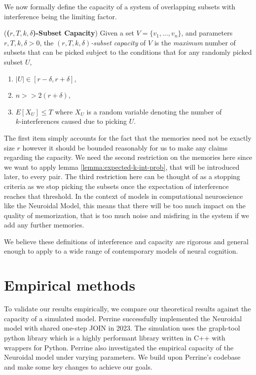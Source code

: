 We now formally define the capacity of a system of overlapping subsets with interference being the limiting factor. 

    \begin{definition} (\textbf{(\textit{$r,T,k,\delta$})-Subset Capacity}) Given a set $V = \{v_1,...,v_n\}$, and parameters $r, T, k, \delta > 0$, the \textit{$(r,T,k,\delta)$-subset capacity} of $V$ is the \textit{maximum} number of subsets that can be picked subject to the conditions that for any randomly picked subset $U$,
        \begin{enumerate}
            \item $|U| \in [r-\delta,r+\delta]$,
            \item $n >> 2(r+\delta)$,
            \item \label{equ:cap-bound-expected}$E[X_U] \le T$ where $X_U$ is a random variable denoting the number of \\
             $k$-interferences caused due to picking $U$. 
        \end{enumerate}
    \end{definition}

    The first item simply accounts for the fact that the memories need not be exactly size $r$ however it should be bounded reasonably for us to make any claims regarding the capacity. We need the second restriction on the memories here since we want to apply lemma \ref{lemma:expected-k-int-prob}, that will be introduced later, to every pair. The third restriction here can be thought of as a stopping criteria as we stop picking the subsets once the expectation of interference reaches that threshold. In the context of models in computational neuroscience like the Neuroidal Model, this means that there will be too much impact on the quality of memorization, that is too much noise and misfiring in the system if we add any further memories.

    We believe these definitions of interference and capacity are rigorous and general enough to apply to a wide range of contemporary models of neural cognition. 

\section{Empirical methods}

To validate our results empirically, we compare our theoretical results against the capacity of a simulated model. Perrine successfully implemented the Neuroidal model with shared one-step JOIN in 2023. The simulation uses the graph-tool python library which is a highly performant library written in C++ with wrappers for Python. Perrine also investigated the empirical capacity of the Neuroidal model under varying parameters. We build upon Perrine's codebase and make some key changes to achieve our goals. 

